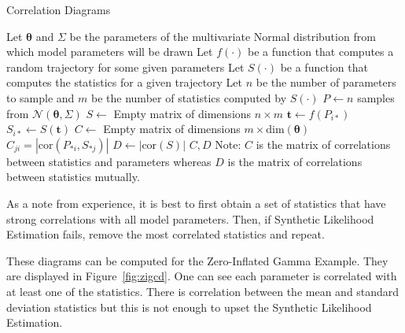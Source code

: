 \begin{singlespace}
    \begin{algorithm}[H]
        \caption{Correlation Diagrams}
        \label{alg:cor_diag}
        \begin{algorithmic}
            \State Let $\pmb{\theta}$ and $\Sigma$ be the parameters of the multivariate Normal distribution from which model parameters will be drawn
            \State Let $f(\cdot)$ be a function that computes a random trajectory for some given parameters
            \State Let $S(\cdot)$ be a function that computes the statistics for a given trajectory
            \State Let $n$ be the number of parameters to sample and $m$ be the number of statistics computed by $S(\cdot)$
            \newline
                \State $P \gets n$ samples from $\mathcal{N}(\pmb{\theta}, \Sigma)$
                \State $S \gets $ Empty matrix of dimensions $n \times m$
                    \State $\pmb{t} \gets f(P_{i*})$
                    \State $S_{i*} \gets S(\pmb{t})$
                \EndFor
                \State $C \gets $ Empty matrix of dimensions $m \times \text{dim}(\pmb{\theta})$
                        \State $C_{ji} = |\text{cor}(P_{*i}, S_{*j})|$
                    \EndFor
                \EndFor
                \State $D \gets |\text{cor}(S)|$
                \State \Return $C, D$
            \EndProcedure
            \newline
            \State Note: $C$ is the matrix of correlations between statistics and parameters whereas $D$ is the matrix of correlations between statistics mutually.
        \end{algorithmic}
    \end{algorithm}
\end{singlespace}

As a note from experience, it is best to first obtain a set of statistics that have strong correlations with all model parameters. Then, if Synthetic Likelihood Estimation fails, remove the most correlated statistics and repeat.

These diagrams can be computed for the Zero-Inflated Gamma Example. They are displayed in Figure~\ref{fig:zigcd}. One can see each parameter is correlated with at least one of the statistics. There is correlation between the mean and standard deviation statistics but this is not enough to upset the Synthetic Likelihood Estimation.

